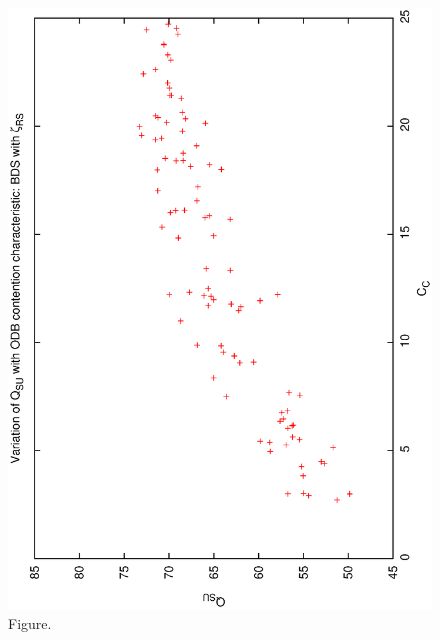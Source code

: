 \documentclass[12pt,a4paper]{article}
\begin{document}
\begin{figure}[htbp]
 \begin{center}
  \includegraphics[scale=1.0, angle=0]{figures/qsucc_biasrs.eps}
 \end{center}
  \caption[Figure.]
{Figure.}
\end{figure}
\clearpage
\end{document}
